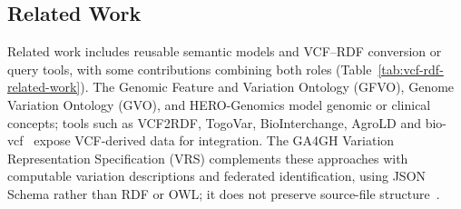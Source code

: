 \subsection{Related Work}
Related work includes reusable semantic models and VCF--RDF conversion or query tools, with some contributions combining both roles (Table~\ref{tab:vcf-rdf-related-work}).
The Genomic Feature and Variation Ontology (GFVO), Genome Variation Ontology (GVO), and HERO-Genomics model genomic or clinical concepts; tools such as VCF2RDF, TogoVar, BioInterchange, AgroLD and bio-vcf~\cite{garrison2022vcflib} expose VCF-derived data for integration.
The GA4GH Variation Representation Specification (VRS) complements these approaches with computable variation descriptions and federated identification, using JSON Schema rather than RDF or OWL; it does not preserve source-file structure~\cite{wagner2021vrs}.

